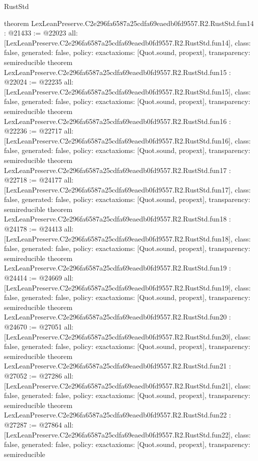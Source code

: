 \begin{lexlean}{RustStd}
\begin{coremodule}
{}
theorem LexLeanPreserve.C2e296fa6587a25cdfa69eaedb0fd9557.R2.RustStd.fun14 : @21433 := @22023 {
  all: [LexLeanPreserve.C2e296fa6587a25cdfa69eaedb0fd9557.R2.RustStd.fun14],
  class: false,
  generated: false,
  policy: exact{axioms: [Quot.sound, propext]},
  transparency: semireducible
}
theorem LexLeanPreserve.C2e296fa6587a25cdfa69eaedb0fd9557.R2.RustStd.fun15 : @22024 := @22235 {
  all: [LexLeanPreserve.C2e296fa6587a25cdfa69eaedb0fd9557.R2.RustStd.fun15],
  class: false,
  generated: false,
  policy: exact{axioms: [Quot.sound, propext]},
  transparency: semireducible
}
theorem LexLeanPreserve.C2e296fa6587a25cdfa69eaedb0fd9557.R2.RustStd.fun16 : @22236 := @22717 {
  all: [LexLeanPreserve.C2e296fa6587a25cdfa69eaedb0fd9557.R2.RustStd.fun16],
  class: false,
  generated: false,
  policy: exact{axioms: [Quot.sound, propext]},
  transparency: semireducible
}
theorem LexLeanPreserve.C2e296fa6587a25cdfa69eaedb0fd9557.R2.RustStd.fun17 : @22718 := @24177 {
  all: [LexLeanPreserve.C2e296fa6587a25cdfa69eaedb0fd9557.R2.RustStd.fun17],
  class: false,
  generated: false,
  policy: exact{axioms: [Quot.sound, propext]},
  transparency: semireducible
}
theorem LexLeanPreserve.C2e296fa6587a25cdfa69eaedb0fd9557.R2.RustStd.fun18 : @24178 := @24413 {
  all: [LexLeanPreserve.C2e296fa6587a25cdfa69eaedb0fd9557.R2.RustStd.fun18],
  class: false,
  generated: false,
  policy: exact{axioms: [Quot.sound, propext]},
  transparency: semireducible
}
theorem LexLeanPreserve.C2e296fa6587a25cdfa69eaedb0fd9557.R2.RustStd.fun19 : @24414 := @24669 {
  all: [LexLeanPreserve.C2e296fa6587a25cdfa69eaedb0fd9557.R2.RustStd.fun19],
  class: false,
  generated: false,
  policy: exact{axioms: [Quot.sound, propext]},
  transparency: semireducible
}
theorem LexLeanPreserve.C2e296fa6587a25cdfa69eaedb0fd9557.R2.RustStd.fun20 : @24670 := @27051 {
  all: [LexLeanPreserve.C2e296fa6587a25cdfa69eaedb0fd9557.R2.RustStd.fun20],
  class: false,
  generated: false,
  policy: exact{axioms: [Quot.sound, propext]},
  transparency: semireducible
}
theorem LexLeanPreserve.C2e296fa6587a25cdfa69eaedb0fd9557.R2.RustStd.fun21 : @27052 := @27286 {
  all: [LexLeanPreserve.C2e296fa6587a25cdfa69eaedb0fd9557.R2.RustStd.fun21],
  class: false,
  generated: false,
  policy: exact{axioms: [Quot.sound, propext]},
  transparency: semireducible
}
theorem LexLeanPreserve.C2e296fa6587a25cdfa69eaedb0fd9557.R2.RustStd.fun22 : @27287 := @27864 {
  all: [LexLeanPreserve.C2e296fa6587a25cdfa69eaedb0fd9557.R2.RustStd.fun22],
  class: false,
  generated: false,
  policy: exact{axioms: [Quot.sound, propext]},
  transparency: semireducible
}
\end{coremodule}
\end{lexlean}
